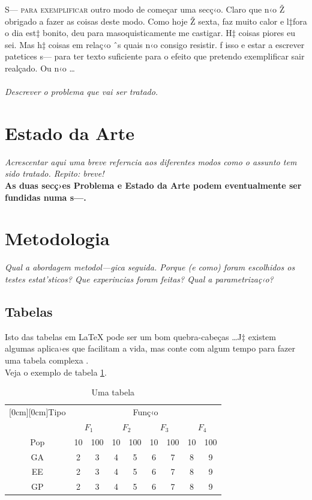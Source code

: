 \documentclass[12pt,portuguese,a4paper]{article}
\begin{document}
\lettrine[lines=2,lraise=0.2]{S}{— para exemplificar} outro modo de come\c car uma sec\c c‹o. Claro que n‹o Ž obrigado a fazer as coisas deste modo. Como hoje Ž sexta, faz muito calor  e l‡fora o dia est‡ bonito, deu para masoquisticamente me castigar. H‡ coisas piores eu sei. Mas h‡ coisas em rela\c c‹o ˆs quais n‹o consigo resistir. ƒ isso e estar a escrever patetices s— para ter texto suficiente para o efeito que pretendo exemplificar sair real\c cado. Ou n‹o \ldots\\\\

\textit{Descrever o problema que vai ser tratado.}

\section{Estado da Arte}

\textit{Acrescentar  aqui uma breve referncia aos diferentes modos como o assunto tem sido tratado. Repito: breve! }\\


{\textbf{\color{red} As duas  sec\c c›es Problema e Estado da Arte podem eventualmente ser fundidas numa s—.}}

\section{Metodologia}

\textit{
Qual a abordagem metodol—gica seguida. Porque (e como)  foram escolhidos os testes estat’sticos? Que experincias foram feitas? Qual a parametriza\c c‹o?
}\\

\subsection{Tabelas}

Isto das tabelas em \LaTeX{} pode ser um bom quebra-cabe\c cas \ldots J‡ existem algumas aplica›es que facilitam a vida, mas conte com algum tempo para fazer uma tabela complexa {\Large{\Frowny}}. \\ Veja o exemplo de tabela \ref{tab:ola}.

\begin{table}[htdp]
\begin{center}
\begin{tabular}{|c|cc|cc|cc|cc|} \hline
\raisebox{-1.5ex}[0cm][0cm]{Tipo} & \multicolumn{8}{c|}{Fun\c c‹o}\\ \cline{2-9}
& \multicolumn{2}{c|}{$F_{1}$} & \multicolumn{2}{c|}{$F_{2}$} &\multicolumn{2}{c|}{$F_{3}$} & \multicolumn{2}{c|}{$F_{4}$} \\ \hline 
Pop & 10  & 100  & 10  & 100 & 10  & 100 & 10  & 100 \\ \hline 
GA &  2 & 3 & 4 & 5 & 6 & 7 & 8 & 9 \\ \hline
EE &  2 & 3 & 4 & 5 & 6 & 7 & 8 & 9 \\ \hline
GP &  2 & 3 & 4 & 5 & 6 & 7 & 8 & 9 \\ \hline
\end{tabular}
\end{center}
\caption{Uma tabela}
\label{tab:ola}
\end{table}
\end{document}
